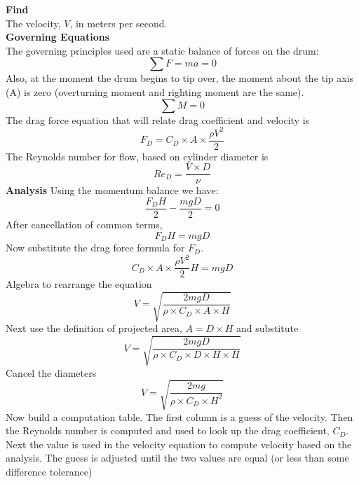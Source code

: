 \documentclass[12pt]{article}
\begin{document}
\textbf{Find}\\
The velocity, $V$, in meters per second.\\
\textbf{Governing Equations}\\
The governing principles used are a static balance of forces on the drum:
\begin{equation}
\sum F = ma = 0 
\end{equation}
Also, at the moment the drum begins to tip over, the moment about the tip axis (A) is zero (overturning moment and righting moment are the same).
\begin{equation}
\sum M = 0 
\end{equation}
The drag force equation that will relate drag coefficient and velocity is
\begin{equation}
F_D = C_D\times A \times \frac{\rho V^2}{2}
\end{equation}
The Reynolds number for flow, based on cylinder diameter is
\begin{equation}
Re_D = \frac{V \times D}{\nu}
\end{equation}
\textbf{Analysis}
Using the momentum balance we have:
\begin{equation}
\frac{F_D H}{2} - \frac{mg D}{2} = 0
\end{equation}
After cancellation of common terms,
\begin{equation}
{F_D H}=mg D
\end{equation}
Now substitute the drag force formula for $F_D$.
\begin{equation}
{ C_D\times A \times \frac{\rho V^2}{2} H}=mg D
\end{equation}
Algebra to rearrange the equation
\begin{equation}
V=\sqrt{ \frac{2 mg D}{\rho \times C_D\times A \times H} }
\end{equation}
Next use the definition of projected area, $A=D \times H$ and substitute
\begin{equation}
V=\sqrt{ \frac{2 mg D}{\rho \times C_D\times D \times H \times H} }
\end{equation}
Cancel the diameters
\begin{equation}
V=\sqrt{ \frac{2 mg }{\rho \times C_D \times H^2} }
\end{equation}
Now build a computation table.
The first column is a guess of the velocity.
Then the Reynolds number is computed and used to look up the drag coefficient, $C_D$.
Next the value is used in the velocity equation to compute velocity based on the analysis.
The guess is adjusted until the two values are equal (or less than some difference tolerance)
\end{document}
